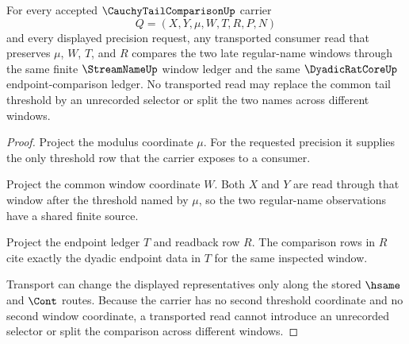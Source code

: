 \begin{theorem}
\label{thm:cauchy-tail-comparison-tail-stability}
For every accepted $\CauchyTailComparisonUp$ carrier
$$
Q=(X,Y,\mu,W,T,R,P,N)
$$
and every displayed precision request, any transported consumer read that preserves $\mu$, $W$, $T$, and $R$ compares the two late regular-name windows through the same finite $\StreamNameUp$ window ledger and the same $\DyadicRatCoreUp$ endpoint-comparison ledger. No transported read may replace the common tail threshold by an unrecorded selector or split the two names across different windows.
\end{theorem}
\begin{proof}
Project the modulus coordinate $\mu$. For the requested precision it supplies the only threshold row that the carrier exposes to a consumer.

Project the common window coordinate $W$. Both $X$ and $Y$ are read through that window after the threshold named by $\mu$, so the two regular-name observations have a shared finite source.

Project the endpoint ledger $T$ and readback row $R$. The comparison rows in $R$ cite exactly the dyadic endpoint data in $T$ for the same inspected window.

Transport can change the displayed representatives only along the stored $\hsame$ and $\Cont$ routes. Because the carrier has no second threshold coordinate and no second window coordinate, a transported read cannot introduce an unrecorded selector or split the comparison across different windows.
\end{proof}


